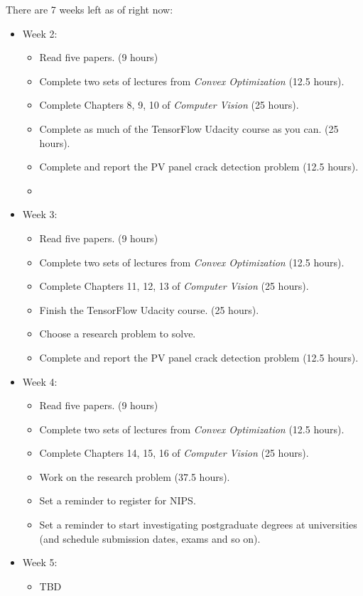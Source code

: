 \documentclass[idxtotoc,hyperref,openany]{labbook} %
\begin{document}
There are 7 weeks left as of right now:
\begin{itemize}
	\item Week 2:
		\begin{itemize}
			\item Read five papers. (9 hours)
			\item Complete two sets of lectures from \emph{Convex Optimization} (12.5 hours).
			\item Complete Chapters 8, 9, 10 of \emph{Computer Vision} (25 hours).
			\item Complete as much of the TensorFlow Udacity course as you can. (25 hours).
			\item Complete and report the PV panel crack detection problem (12.5 hours).
			\item 
		\end{itemize}
	\item Week 3:
		\begin{itemize}
			\item Read five papers. (9 hours)
			\item Complete two sets of lectures from \emph{Convex Optimization} (12.5 hours).
			\item Complete Chapters 11, 12, 13 of \emph{Computer Vision} (25 hours).
			\item Finish the TensorFlow Udacity course. (25 hours).
			\item Choose a research problem to solve.
			\item Complete and report the PV panel crack detection problem (12.5 hours).
		\end{itemize}
	\item Week 4:
		\begin{itemize}
			\item Read five papers. (9 hours)
			\item Complete two sets of lectures from \emph{Convex Optimization} (12.5 hours).
			\item Complete Chapters 14, 15, 16 of \emph{Computer Vision} (25 hours).
			\item Work on the research problem (37.5 hours).
			\item Set a reminder to register for NIPS.
			\item Set a reminder to start investigating postgraduate degrees at universities (and schedule submission dates, exams and so on).
		\end{itemize}
	\item Week 5:
		\begin{itemize}
			\item TBD
		\end{itemize}
\end{itemize}
\end{document}
